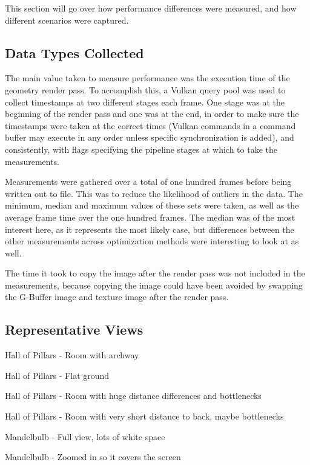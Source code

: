 This section will go over how performance differences were measured, and how different scenarios were captured.

\subsection{Data Types Collected}

The main value taken to measure performance was the execution time of the geometry render pass. To accomplish this, a Vulkan query pool was used to collect timestamps at two different stages each frame. One stage was at the beginning of the render pass and one was at the end, in order to make sure the timestamps were taken at the correct times (Vulkan commands in a command buffer may execute in any order unless specific synchronization is added), and consistently, with flags specifying the pipeline stages at which to take the measurements.\newline

Measurements were gathered over a total of one hundred frames before being written out to file. This was to reduce the likelihood of outliers in the data. The minimum, median and maximum values of these sets were taken, as well as the average frame time over the one hundred frames. The median was of the most interest here, as it represents the most likely case, but differences between the other measurements across optimization methods were interesting to look at as well.\newline

The time it took to copy the image after the render pass was not included in the measurements, because copying the image could have been avoided by swapping the G-Buffer image and texture image after the render pass.

\subsection{Representative Views}

Hall of Pillars - Room with archway

Hall of Pillars - Flat ground

Hall of Pillars - Room with huge distance differences and bottlenecks

Hall of Pillars - Room with very short distance to back, maybe bottlenecks

Mandelbulb - Full view, lots of white space

Mandelbulb - Zoomed in so it covers the screen

